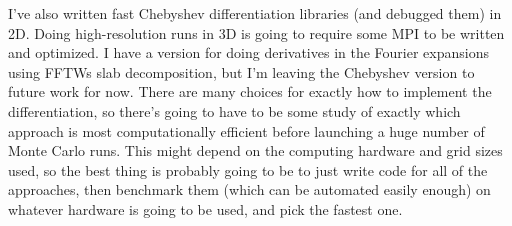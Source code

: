 \documentclass{revtex4}
\begin{document}
I've also written fast Chebyshev differentiation libraries (and debugged them) in 2D.  Doing high-resolution runs in 3D is going to require some MPI to be written and optimized.  I have a version for doing derivatives in the Fourier expansions using FFTWs slab decomposition, but I'm leaving the Chebyshev version to future work for now.  There are many choices for exactly how to implement the differentiation, so there's going to have to be some study of exactly which approach is most computationally efficient before launching a huge number of Monte Carlo runs.  This might depend on the computing hardware and grid sizes used, so the best thing is probably going to be to just write code for all of the approaches, then benchmark them (which can be automated easily enough) on whatever hardware is going to be used, and pick the fastest one.
\end{document}
